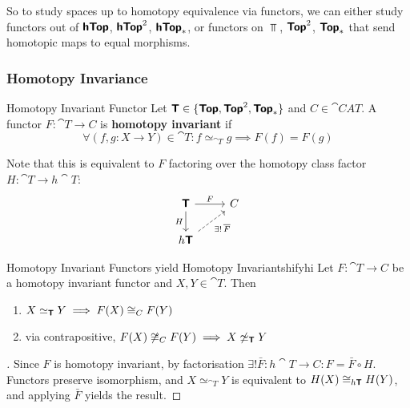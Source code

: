 So to study spaces up to homotopy equivalence via functors, we can either study functors out of $\bm{\mathsf{hTop}}$, $\bm{\mathsf{hTop}}^{2}$, $\bm{\mathsf{hTop}}_*$, or functors on $\Top$, $\bm{\mathsf{Top}}^{2}$, $\bm{\mathsf{Top}}_*$ that send homotopic maps to equal morphisms.

\subsubsection{Homotopy Invariance}\label{sec:htpyinv}

\begin{definition}{Homotopy Invariant Functor}{}
  Let $\bm{\mathsf{T}}\in\{\bm{\mathsf{Top}},\bm{\mathsf{Top}}^{2},\bm{\mathsf{Top}}_*\}$ and $C\in\cat{CAT}$. A functor $F:\cat{T}\to C$ is \textbf{homotopy invariant} if \[
    \forall (f,g:X\to Y)\in \cat{T}: f\simeq_{\cat{T}} g \implies F(f)=F(g)
  \]
\end{definition}

Note that this is equivalent to $F$ factoring over the homotopy class factor $H:\cat{T}\to h\cat{T}$:
\[
\begin{tikzcd}
  \cat{T} \ar[r, "F"] \ar[d, "H"'] & C \\
  h\cat{T} \ar[ur, dashed, "\exists!\,\overline{F}"']
\end{tikzcd}
\]

\begin{theorem}{Homotopy Invariant Functors yield Homotopy Invariants}{hifyhi}
  Let $F:\cat{T}\to C$ be a homotopy invariant functor and $X,Y\in\cat{T}$. Then \begin{enumerate}
    \item $X\simeq_{\bm{\mathsf{T}}}Y\implies F(X)\cong_CF(Y)$
    \item via contrapositive, $F(X)\not\cong_CF(Y)\implies X\not\simeq_{\bm{\mathsf{T}}}Y$
  \end{enumerate}
\end{theorem}
\begin{proof}[]
  Since $F$ is homotopy invariant, by factorisation $\exists! \bar{F}:h\cat{T}\to C: F=\bar{F}\circ H$. Functors preserve isomorphism, and $X\simeq_{\cat{T}} Y$ is equivalent to $H(X)\cong_{h\bm{\mathsf{T}}}H(Y)$, and applying $\bar{F}$ yields the result.
\end{proof}

